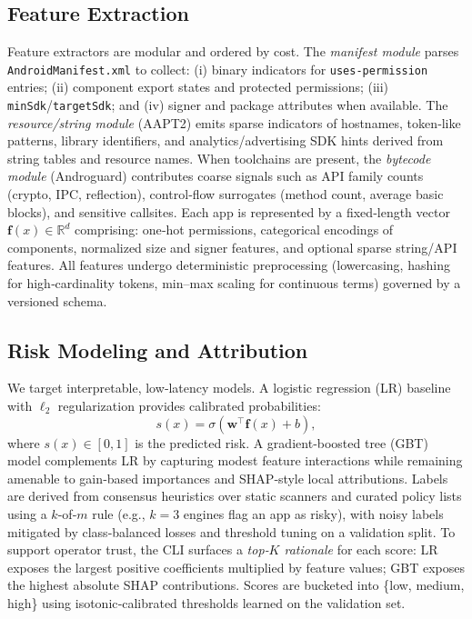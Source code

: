 \documentclass[10pt,conference]{IEEEtran}
\begin{document}
\subsection{Feature Extraction}
Feature extractors are modular and ordered by cost. The \emph{manifest module} parses \texttt{AndroidManifest.xml} to collect: (i) binary indicators for \texttt{uses\mbox{-}permission} entries; (ii) component export states and protected permissions; (iii) \texttt{minSdk}/\texttt{targetSdk}; and (iv) signer and package attributes when available. The \emph{resource/string module} (AAPT2) emits sparse indicators of hostnames, token‐like patterns, library identifiers, and analytics/advertising SDK hints derived from string tables and resource names. When toolchains are present, the \emph{bytecode module} (Androguard) contributes coarse signals such as API family counts (crypto, IPC, reflection), control‐flow surrogates (method count, average basic blocks), and sensitive callsites. Each app is represented by a fixed‐length vector $\mathbf{f}(x)\in\mathbb{R}^d$ comprising: one‐hot permissions, categorical encodings of components, normalized size and signer features, and optional sparse string/API features. All features undergo deterministic preprocessing (lowercasing, hashing for high‐cardinality tokens, min–max scaling for continuous terms) governed by a versioned schema.

\subsection{Risk Modeling and Attribution}
We target interpretable, low‐latency models. A logistic regression (LR) baseline with $\ell_2$ regularization provides calibrated probabilities:
\[
 s(x)=\sigma\!\left(\mathbf{w}^{\top}\mathbf{f}(x)+b\right),
\]
where $s(x)\in[0,1]$ is the predicted risk. A gradient‐boosted tree (GBT) model complements LR by capturing modest feature interactions while remaining amenable to gain‐based importances and SHAP‐style local attributions. Labels are derived from consensus heuristics over static scanners and curated policy lists using a $k$‐of‐$m$ rule (e.g., $k{=}3$ engines flag an app as risky), with noisy labels mitigated by class‐balanced losses and threshold tuning on a validation split. To support operator trust, the CLI surfaces a \emph{top‐$K$ rationale} for each score: LR exposes the largest positive coefficients multiplied by feature values; GBT exposes the highest absolute SHAP contributions. Scores are bucketed into \{low, medium, high\} using isotonic‐calibrated thresholds learned on the validation set.
\end{document}
